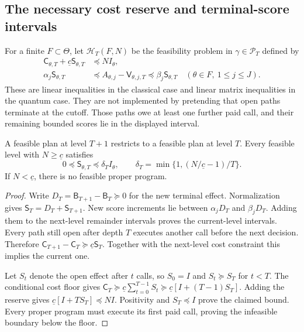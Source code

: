 \subsection{The necessary cost reserve and terminal-score intervals}
For a finite $F\subset\Theta$, let $\mathcal H_T(F,N)$ be the feasibility problem in $\gamma\in\mathcal P_T$ defined by
\begin{align}
 \mathsf C_{\theta,T}+\underline c\mathsf S_{\theta,T}
       &\preccurlyeq NI_\theta,\label{eq:hier-cost}\\
 \alpha_j\mathsf S_{\theta,T}
       &\preccurlyeq A_{\theta,j}-\mathsf V_{\theta,j,T}
        \preccurlyeq\beta_j\mathsf S_{\theta,T}
       \quad(\theta\in F,\ 1\le j\le J).\label{eq:hier-tail}
\end{align}
These are linear inequalities in the classical case and linear matrix inequalities in the quantum case. They are not implemented by pretending that open paths terminate at the cutoff. Those paths owe at least one further paid call, and their remaining bounded scores lie in the displayed interval.

\begin{lemma}\label{lem:synthesis-tail}
A feasible plan at level $T+1$ restricts to a feasible plan at level $T$. Every feasible level with $N\ge\underline c$ satisfies
\begin{equation}\label{eq:sharp-tail}
 0\preccurlyeq\mathsf S_{\theta,T}\preccurlyeq
 \delta_T I_\theta,\qquad
 \delta_T=\min\{1,(N/\underline c-1)/T\}.
\end{equation}
If $N<\underline c$, there is no feasible proper program.
\end{lemma}
\begin{proof}
Write $D_T=\mathsf B_{T+1}-\mathsf B_T\succeq0$ for the new terminal effect. Normalization gives $\mathsf S_T=D_T+\mathsf S_{T+1}$. New score increments lie between $\alpha_jD_T$ and $\beta_jD_T$. Adding them to the next-level remainder intervals proves the current-level intervals. Every path still open after depth $T$ executes another call before the next decision. Therefore $\mathsf C_{T+1}-\mathsf C_T\succeq\underline c\mathsf S_T$. Together with the next-level cost constraint this implies the current one.

Let $S_t$ denote the open effect after $t$ calls, so $S_0=I$ and $S_t\succeq S_T$ for $t<T$. The conditional cost floor gives $\mathsf C_T\succeq\underline c\sum_{t=0}^{T-1}S_t\succeq\underline c[I+(T-1)S_T]$. Adding the reserve gives $\underline c[I+TS_T]\preccurlyeq NI$. Positivity and $S_T\preccurlyeq I$ prove the claimed bound. Every proper program must execute its first paid call, proving the infeasible boundary below the floor.
\end{proof}

